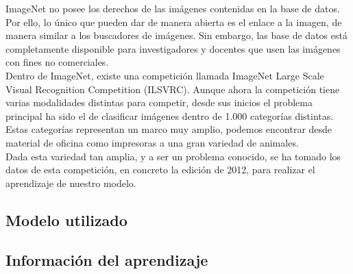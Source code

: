 ImageNet no posee los derechos de las imágenes contenidas en la base de datos. Por ello, lo único que pueden dar de manera abierta es el enlace a la imagen, de manera similar a los buscadores de imágenes. Sin embargo, las base de datos está completamente disponible para investigadores y docentes que usen las imágenes con fines no comerciales.\\

Dentro de ImageNet, existe una competición llamada ImageNet Large Scale Visual Recognition Competition (ILSVRC). Aunque ahora la competición tiene varias modalidades distintas para competir, desde sus inicios el problema principal ha sido el de clasificar imágenes dentro de 1.000 categorías distintas. Estas categorías representan un marco muy amplio, podemos encontrar desde material de oficina como impresoras a una gran variedad de animales.\\

Dada esta variedad tan amplia, y a ser un problema conocido, se ha tomado los datos de esta competición, en concreto la edición de 2012, para realizar el aprendizaje de nuestro modelo.\\

\subsection{Modelo utilizado}

\subsection{Información del aprendizaje}


